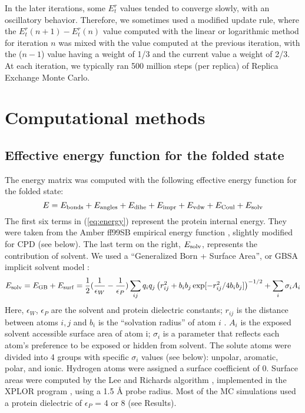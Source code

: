 \documentclass[12pt]{article}
\begin{document}
In the later iterations, some $E^r_t$ values tended to converge slowly, with an oscillatory behavior. Therefore,
we sometimes used a modified update rule, where the $E^r_t (n+1) - E^r_t (n)$ value computed with the linear or
logarithmic method for iteration $n$ was mixed with the value computed at the previous iteration, with the
($n-1$) value having a weight of 1/3 and the current value a weight of 2/3. At each iteration, we typically ran
500 million steps (per replica) of Replica Exchange Monte Carlo.

\section{Computational methods}
\subsection{Effective energy function for the folded state}
The energy matrix was computed with the following effective energy function for the folded state:
\begin{equation} \label{eq:energy}
E = E_{\rm bonds} + E_{\rm angles} + E_{\rm dihe} + E_{\rm impr} + E_{\rm vdw} + E_{\rm Coul} + E_{\rm solv}
\end{equation}
The first six terms in (\ref{eq:energy}) represent the protein internal energy. They were taken from the
Amber ff99SB empirical energy function \cite{Cornell95}, slightly modified for CPD (see below). The last
term on the right, $E_{\rm solv}$, represents the contribution of solvent. We used a ``Generalized Born +
Surface Area'', or GBSA implicit solvent model \cite{Hawkins95}:
\begin{equation} \label{eq:casa}
E_{\rm solv} = E_{\rm GB} + E_{\rm surf} = 
\frac{1}{2} (\frac{1}{\epsilon_W} - \frac{1}{\epsilon_P}) 
   \sum_{ij} q_i q_j \left( r_{ij}^2 + b_i b_j \exp[-r_{ij}^2/4 b_i b_j] \right)^{-1/2}
   + \sum_i \sigma_i A_i
\end{equation}
Here, $\epsilon_W$, $\epsilon_P$ are the solvent and protein dielectric constants; $r_{ij}$ is the distance
between atoms $i,j$ and $b_i$ is the ``solvation radius'' of atom $i$ \cite{Hawkins95,Lopes07}. $A_i$ is
the exposed solvent accessible surface area of atom i; $\sigma_i$ is a parameter that reflects each atom's
preference to be exposed or hidden from solvent. The solute atoms were divided into 4 groups with specific
$\sigma_i$ values (see below): unpolar, aromatic, polar, and ionic. Hydrogen atoms were assigned a surface
coefficient of 0. Surface areas were computed by the Lee and Richards algorithm \cite{Lee71}, implemented
in the XPLOR program \cite{Xplor}, using a 1.5 {\AA} probe radius. Most of the MC simulations used a protein
dielectric of $\epsilon_P$ = 4 or 8 (see Results).
\end{document}
